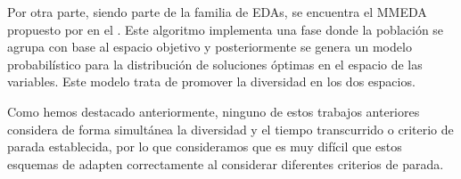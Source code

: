 Por otra parte, siendo parte de la familia de EDAs, se encuentra el MMEDA propuesto por \citeauthor{zhou2009approximating} 
en el \citeyear{zhou2009approximating}.
%
Este algoritmo implementa una fase donde la población se agrupa con base al espacio objetivo y posteriormente 
se genera un modelo probabilístico para la distribución de soluciones óptimas en el espacio de las variables.
%
Este modelo trata de promover la diversidad en los dos espacios.

Como hemos destacado anteriormente, ninguno de estos trabajos anteriores considera de forma simultánea la diversidad y el tiempo
transcurrido o criterio de parada establecida, por lo que consideramos que es muy difícil que estos esquemas de adapten correctamente
al considerar diferentes criterios de parada.
